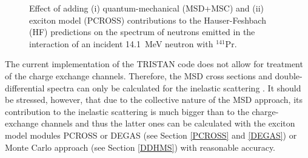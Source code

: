 \documentclass[twocolumn,amsmath,amssymb,10pt,groupedaddress,letter]{revtex4}
\begin{document}
\begin{figure}[htbp]
\caption{Effect of adding (i) quantum-mechanical (MSD+MSC) and (ii) exciton model (PCROSS) contributions to the Hauser-Feshbach (HF) predictions on the spectrum of neutrons emitted in the interaction of an incident
14.1~MeV neutron with $^{141}$Pr.}
\label{PrMSD}
\end{figure}


The current implementation of the TRISTAN
code does not allow for treatment of the charge exchange channels.
Therefore, the MSD cross sections and double-differential
spectra can only be calculated for the inelastic scattering . It should
be stressed, however, that due to the collective nature of the MSD
approach, its contribution to the inelastic scattering is much bigger
than to the charge-exchange channels and thus the latter ones can
be calculated with the exciton model modules PCROSS or DEGAS (see Section
\ref{PCROSS} and \ref{DEGAS}) or Monte Carlo approach (see Section \ref{DDHMS}) with
reasonable accuracy.


\end{document}
